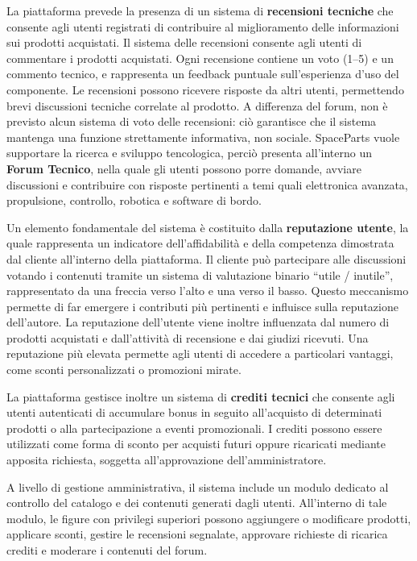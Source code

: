 \documentclass[a4paper,12pt]{report}
\begin{document}
La piattaforma prevede la presenza di un sistema di \textbf{recensioni tecniche} che consente agli utenti registrati di contribuire al miglioramento delle informazioni sui prodotti acquistati. Il sistema delle recensioni consente agli utenti di commentare i prodotti acquistati. 
Ogni recensione contiene un voto (1–5) e un commento tecnico, e rappresenta un feedback puntuale sull’esperienza d’uso del componente. Le recensioni possono ricevere risposte da altri utenti, permettendo brevi discussioni tecniche correlate al prodotto.
A differenza del forum, non è previsto alcun sistema di voto delle recensioni: 
ciò garantisce che il sistema mantenga una funzione strettamente informativa, 
non sociale.
SpaceParts vuole supportare la ricerca e sviluppo tencologica, perciò presenta all'interno un \textbf{Forum Tecnico}, nella quale gli utenti possono porre domande, avviare discussioni e contribuire con risposte pertinenti a temi quali elettronica avanzata, propulsione, controllo, robotica e software di bordo.

Un elemento fondamentale del sistema è costituito dalla \textbf{reputazione utente}, la quale rappresenta un indicatore dell’affidabilità e della competenza dimostrata dal cliente all’interno della piattaforma.
Il cliente può partecipare alle discussioni votando i contenuti tramite un sistema di valutazione binario “utile / inutile”, rappresentato da una freccia verso l’alto e una verso il basso. Questo meccanismo permette di far emergere i contributi più pertinenti e influisce sulla reputazione dell’autore. La reputazione dell’utente viene inoltre 
influenzata dal numero di prodotti acquistati e dall’attività di recensione e dai giudizi ricevuti. Una reputazione più elevata permette agli utenti di accedere a particolari vantaggi, come sconti personalizzati o promozioni mirate.

La piattaforma gestisce inoltre un sistema di \textbf{crediti tecnici} che consente agli utenti autenticati di accumulare bonus in seguito all’acquisto di determinati prodotti o alla partecipazione a eventi promozionali. I crediti possono essere utilizzati come forma di sconto per acquisti futuri oppure ricaricati mediante apposita richiesta, soggetta all’approvazione dell’amministratore.

A livello di gestione amministrativa, il sistema include un modulo dedicato al controllo del catalogo e dei contenuti generati dagli utenti. All'interno di tale modulo, le figure con privilegi superiori possono aggiungere o modificare prodotti, applicare sconti, gestire le recensioni segnalate, approvare richieste di ricarica crediti e moderare i contenuti del forum.
\end{document}
